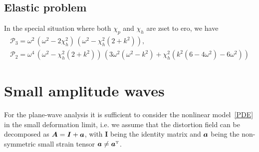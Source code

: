 \documentclass[
10pt, %
a4paper, %
oneside, %
headinclude,footinclude, %
table
]{scrartcl}
\begin{document}
\subsection{Elastic problem}

In the special situation where both $\chi_{p}$ and $\chi_{h}$ are zset to ero, we have
$$
\begin{array}{c}
\mathcal{P}_{3}=\omega^2\, \left(\omega^2-2\chi_{h}^2\right)\, \left(\omega^2-\chi_{h}^2(2+k^2)\right), \\[6pt]
\mathcal{P}_{2}=\omega^4 \, \left(\omega^2-\chi_{h}^2(2+k^2)\right) \, \left( 
 3 \omega^2(\omega^2 - k^2)+ \chi_{h}^2( k^2 (6 - 4 \omega^2)-6 \omega^2)  \right)
 \end{array}
$$

\section{Small amplitude waves}

For the plane-wave analysis it is sufficient to consider the nonlinear model~\eqref{PDE} in the 
small deformation limit, i.e. we assume that the distortion field can be decomposed as $ \bm{A} = 
\bm{I} + \bm{a} $, with $ \bm{I} $ being the identity matrix and $ \bm{a} $ being the 
non-symmetric small strain tensor $ \Distsmall \neq \Distsmall^\transpose $.



\printbibliography
\end{document}

